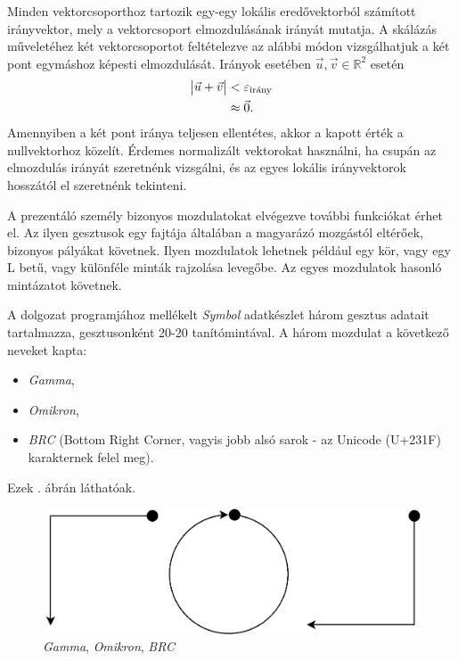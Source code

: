 Minden vektorcsoporthoz tartozik egy-egy lokális eredővektorból számított irányvektor, mely a vektorcsoport elmozdulásának irányát mutatja.
A skálázás műveletéhez két vektorcsoportot feltételezve az alábbi módon vizsgálhatjuk a két pont egymáshoz képesti elmozdulását.
Irányok esetében $\vec{u},\vec{v}\in \mathbb{R}^2$ esetén
\begin{align*}
\vmatrix \vec{u}+\vec{v} \endvmatrix &< \varepsilon_{\text{irány}}\\
&\approx \vec{0}.
\end{align*}
Amennyiben a két pont iránya teljesen ellentétes, akkor a kapott érték a nullvektorhoz közelít. Érdemes normalizált vektorokat használni, ha csupán az elmozdulás irányát szeretnénk vizsgálni, és az egyes lokális irányvektorok hosszától el szeretnénk tekinteni.

\label{ssec:symbol}

A prezentáló személy bizonyos mozdulatokat elvégezve további funkciókat érhet el. Az ilyen gesztusok egy fajtája általában a magyarázó mozgástól eltérőek, bizonyos pályákat követnek. Ilyen mozdulatok lehetnek például egy kör, vagy egy L betű, vagy különféle minták rajzolása levegőbe. Az egyes mozdulatok hasonló mintázatot követnek.

A dolgozat programjához mellékelt \textit{Symbol} adatkészlet három gesztus adatait tartalmazza, gesztusonként 20-20 tanítómintával. A három mozdulat a következő neveket kapta:
\begin{itemize}
	\item \textit{Gamma},
	\item \textit{Omikron},
	\item \textit{BRC} (Bottom Right Corner, vagyis jobb alsó sarok - az Unicode (U+231F) karakternek felel meg).
\end{itemize}
Ezek . ábrán láthatóak.

\begin{figure}[h]
\centering
\includegraphics[width=10truecm]{images/symbols.png}
\caption{\textit{Gamma}, \textit{Omikron}, \textit{BRC}}
\label{fig:symbols}
\end{figure}

